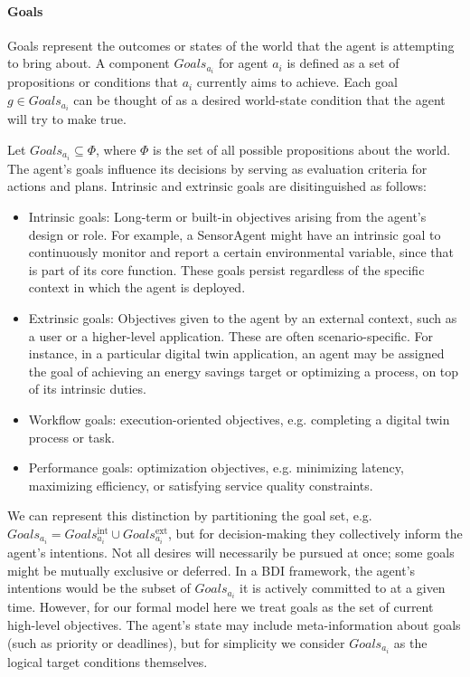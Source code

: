 \paragraph{Goals}

Goals represent the outcomes or states of the world that the agent is attempting to bring about. A component $Goals_{a_i}$ for agent $a_i$ is defined as a set of propositions or conditions that $a_i$ currently aims to achieve. Each goal $g \in Goals_{a_i}$ can be thought of as a desired world-state condition that the agent will try to make true. 

Let $Goals_{a_i} \subseteq \Phi$, where $\Phi$ is the set of all possible propositions about the world. The agent’s goals influence its decisions by serving as evaluation criteria for actions and plans. Intrinsic and extrinsic goals are disitinguished as follows:
\begin{itemize}
    \item Intrinsic goals: Long-term or built-in objectives arising from the agent’s design or role. For example, a SensorAgent might have an intrinsic goal to continuously monitor and report a certain environmental variable, since that is part of its core function. These goals persist regardless of the specific context in which the agent is deployed.

    \item Extrinsic goals: Objectives given to the agent by an external context, such as a user or a higher-level application. These are often scenario-specific. For instance, in a particular digital twin application, an agent may be assigned the goal of achieving an energy savings target or optimizing a process, on top of its intrinsic duties.
    \item Workflow goals: execution-oriented objectives, e.g. completing a digital twin process or task.
    \item Performance goals: optimization objectives, e.g. minimizing latency, maximizing efficiency, or satisfying service quality constraints.
\end{itemize}

We can represent this distinction by partitioning the goal set, e.g. $Goals_{a_i} = Goals_{a_i}^{\text{int}} \cup Goals_{a_i}^{\text{ext}}$, but for decision-making they collectively inform the agent’s intentions. Not all desires will necessarily be pursued at once; some goals might be mutually exclusive or deferred. In a BDI framework, the agent’s intentions would be the subset of $Goals_{a_i}$ it is actively committed to at a given time. However, for our formal model here we treat goals as the set of current high-level objectives. The agent’s state may include meta-information about goals (such as priority or deadlines), but for simplicity we consider $Goals_{a_i}$ as the logical target conditions themselves.




